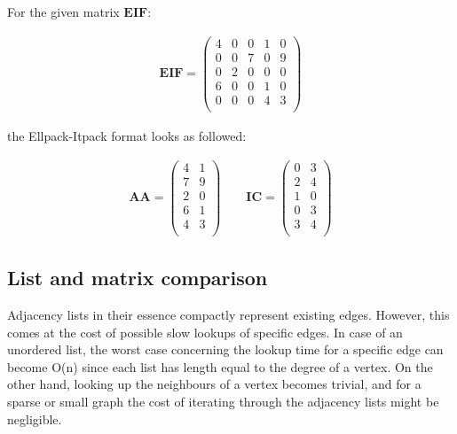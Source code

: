 \documentclass[thesis=M,english]{FITthesis}[2012/10/20]
\begin{document}
For the given matrix $\textbf{EIF}$:

$$
\begin{array}{c}
\textbf{EIF} = 
\begin{pmatrix}
4 & 0 & 0 & 1 & 0 \\
0 & 0 & 7 & 0 & 9 \\
0 & 2 & 0 & 0 & 0 \\
6 & 0 & 0 & 1 & 0 \\
0 & 0 & 0 & 4 & 3\\
\end{pmatrix}
\end{array}
$$

the Ellpack-Itpack format looks as followed:
 
$$
\begin{array}{lr}
\textbf{AA} = 
\begin{pmatrix}
4 & 1 \\
7 & 9 \\
2 & 0 \\
6 & 1 \\
4 & 3 \\
\end{pmatrix}
\quad \quad
\textbf{IC} = 
\begin{pmatrix}
0 & 3  \\
2 & 4 \\
1 & 0 \\
0 & 3\\
3 & 4 \\
\end{pmatrix}
\end{array}
$$

\subsection{List and matrix comparison}

Adjacency lists in their essence compactly represent existing edges. 
However, this comes at the cost of possible slow lookups of specific edges.
In case of an unordered list, the worst case concerning the lookup time for a specific edge can become O(n) since each list has length equal to the degree of a vertex.
On the other hand, looking up the neighbours of a vertex becomes trivial, and for a sparse or small graph the cost of iterating through the adjacency lists might be negligible.
\end{document}
